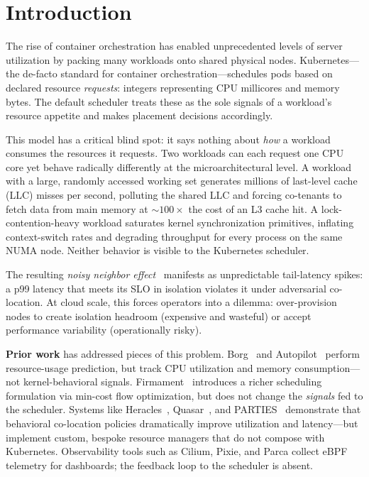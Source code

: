 \documentclass[10pt,conference,a4paper]{IEEEtran}
\begin{document}
\section{Introduction}
\label{sec:intro}

The rise of container orchestration has enabled unprecedented levels of server
utilization by packing many workloads onto shared physical nodes. Kubernetes---the
de-facto standard for container orchestration---schedules pods based on declared
resource \emph{requests}: integers representing CPU millicores and memory bytes.
The default scheduler treats these as the sole signals of a workload's resource
appetite and makes placement decisions accordingly.

This model has a critical blind spot: it says nothing about \emph{how} a workload
consumes the resources it requests. Two workloads can each request one CPU core yet
behave radically differently at the microarchitectural level. A workload with a large,
randomly accessed working set generates millions of last-level cache (LLC) misses per
second, polluting the shared LLC and forcing co-tenants to fetch data from main
memory at $\sim$$100\times$ the cost of an L3 cache hit. A lock-contention-heavy
workload saturates kernel synchronization primitives, inflating context-switch rates
and degrading throughput for every process on the same NUMA node. Neither behavior is
visible to the Kubernetes scheduler.

The resulting \emph{noisy neighbor effect}~\cite{lo2015heracles,mars2011bubble,kasture2016ubik}
manifests as unpredictable tail-latency spikes: a p99 latency that meets its SLO in
isolation violates it under adversarial co-location. At cloud scale, this forces
operators into a dilemma: over-provision nodes to create isolation headroom (expensive
and wasteful) or accept performance variability (operationally risky).

\textbf{Prior work} has addressed pieces of this problem.
Borg~\cite{borg2015} and Autopilot~\cite{wilkes2020autopilot} perform resource-usage
prediction, but track CPU utilization and memory consumption---not kernel-behavioral
signals. Firmament~\cite{firmament2016} introduces a richer scheduling formulation via
min-cost flow optimization, but does not change the \emph{signals} fed to the
scheduler. Systems like Heracles~\cite{lo2015heracles}, Quasar~\cite{delimitrou2014quasar},
and PARTIES~\cite{parties2019} demonstrate that behavioral co-location policies
dramatically improve utilization and latency---but implement custom, bespoke resource
managers that do not compose with Kubernetes. Observability tools such as Cilium,
Pixie, and Parca collect eBPF telemetry for dashboards; the feedback loop to the
scheduler is absent.
\end{document}
